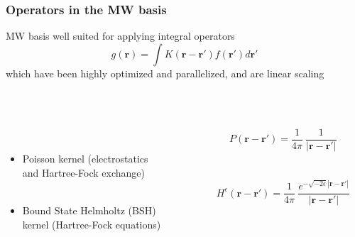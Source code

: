 \documentclass[mathserif]{beamer}
\begin{document}
\begin{frame}
    \frametitle{Operators in the MW basis}
    MW basis well suited for applying integral operators
    \begin{equation}
	\nonumber
	g(\boldsymbol{r}) = \int K(\boldsymbol{r} - \boldsymbol{r'}) 
	    f(\boldsymbol{r'}) d\boldsymbol{r'}
    \end{equation}
    which have been highly optimized and parallelized, and are linear scaling
    \ \\
    \ \\
    \pause
    \begin{columns}
    \begin{column}{.48\textwidth}
    \ \\
    \ \\
    \begin{itemize}
	\item Poisson kernel (electrostatics \\
	    and Hartree-Fock exchange) \\
	    \ \\
	\item Bound State Helmholtz (BSH) \\
	    kernel (Hartree-Fock equations) \\
	    \ \\
    \end{itemize}
    \end{column}
    \begin{column}{.48\textwidth}
    \ \\
    \begin{equation}
	\nonumber
	P(\boldsymbol{r}-\boldsymbol{r}') = 
	    \frac{1}{4\pi}\ \frac{1}{|\boldsymbol{r}-\boldsymbol{r}'|}
    \end{equation}
    \ \\
    \ \\
    \begin{equation}
	\nonumber
	H^{\epsilon}(\boldsymbol{r}-\boldsymbol{r}') = \frac{1}{4\pi}\ 
	    \frac{e^{-\sqrt{-2\epsilon} |\boldsymbol{r}-\boldsymbol{r}'|}}{|\boldsymbol{r}-\boldsymbol{r}'|}
    \end{equation}
    \end{column}
    \end{columns}
\end{frame}
\end{document}
